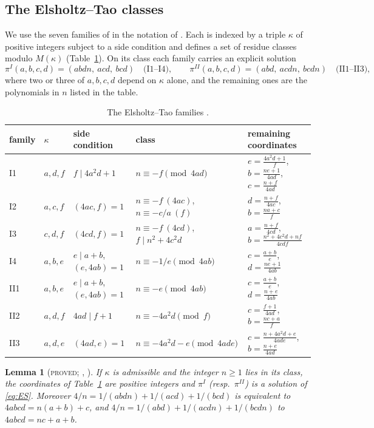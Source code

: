 \documentclass[11pt,reqno]{amsart}
\newtheorem{lemma}[theorem]{Lemma}
\theoremstyle{definition}
\newcommand{\status}[1]{\textup{\textsc{#1}}}
\begin{document}
\subsection{The Elsholtz--Tao classes}
We use the seven families of \cite[Prop.~1.9]{ET} in the notation of
\cite[\S2]{CovNote}.  Each is indexed by a triple $\kappa$ of positive
integers subject to a side condition and defines a set of residue classes
modulo $M(\kappa)$ (Table~\ref{tab:ET}).  On its class each family carries
an explicit solution
\[
 \pi^{I}(a,b,c,d)=(abdn,\ acd,\ bcd)\quad\text{(I1--I4)},\qquad
 \pi^{II}(a,b,c,d)=(abd,\ acdn,\ bcdn)\quad\text{(II1--II3)},
\]
where two or three of $a,b,c,d$ depend on $\kappa$ alone, and the
remaining ones are the polynomials in $n$ listed in the table.%
\begin{table}[ht]
\centering\small
\begin{tabular}{lllll}
\toprule
family & $\kappa$ & side condition & class & remaining coordinates\\
\midrule
I1 & $a,d,f$ & $f\mid 4a^2d+1$ & $n\equiv-f \pmod{4ad}$ & $e=\frac{4a^2d+1}{f}$, $b=\frac{ne+1}{4ad}$, $c=\frac{n+f}{4ad}$\\
I2 & $a,c,f$ & $(4ac,f)=1$ & $n\equiv-f\ (4ac)$, $n\equiv -c/a\ (f)$ & $d=\frac{n+f}{4ac}$, $b=\frac{na+c}{f}$\\
I3 & $c,d,f$ & $(4cd,f)=1$ & $n\equiv-f\ (4cd)$, $f\mid n^2+4c^2d$ & $a=\frac{n+f}{4cd}$, $b=\frac{n^2+4c^2d+nf}{4cdf}$\\
I4 & $a,b,e$ & $e\mid a+b$, $(e,4ab)=1$ & $n\equiv-1/e \pmod{4ab}$ & $c=\frac{a+b}{e}$, $d=\frac{ne+1}{4ab}$\\
II1 & $a,b,e$ & $e\mid a+b$, $(e,4ab)=1$ & $n\equiv-e\pmod{4ab}$ & $c=\frac{a+b}{e}$, $d=\frac{n+e}{4ab}$\\
II2 & $a,d,f$ & $4ad\mid f+1$ & $n\equiv-4a^2d\pmod f$ & $c=\frac{f+1}{4ad}$, $b=\frac{nc+a}{f}$\\
II3 & $a,d,e$ & $(4ad,e)=1$ & $n\equiv-4a^2d-e\pmod{4ade}$ & $c=\frac{n+4a^2d+e}{4ade}$, $b=\frac{n+e}{4ad}$\\
\bottomrule
\end{tabular}
\caption{The Elsholtz--Tao families \cite[Prop.~1.9]{ET}.}\label{tab:ET}
\end{table}

\begin{lemma}[\status{proved}; {\cite[\S\S2,10]{ET}, \cite[Lemma~2.1]{CovNote}}]\label{lem:solve}
If $\kappa$ is admissible and the integer $n\ge1$ lies in its class, the
coordinates of Table~\ref{tab:ET} are positive integers and $\pi^{I}$
\textup{(}resp.\ $\pi^{II}$\textup{)} is a solution of \eqref{eq:ES}.
Moreover $4/n=1/(abdn)+1/(acd)+1/(bcd)$ is equivalent to
$4abcd=n(a+b)+c$, and $4/n=1/(abd)+1/(acdn)+1/(bcdn)$ to $4abcd=nc+a+b$.
\end{lemma}
\end{document}
